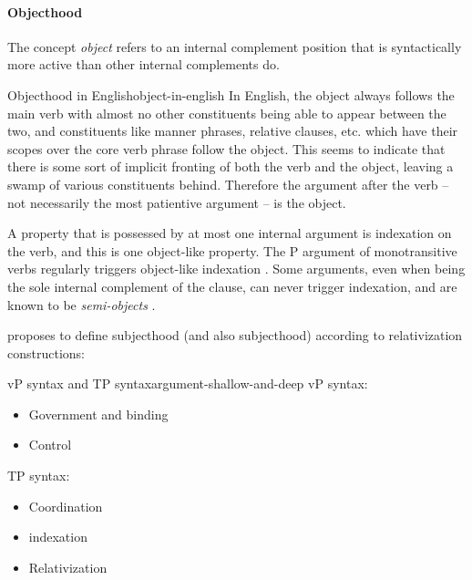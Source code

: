 \documentclass[a4paper, oneside, 12pt]{report}
\newcommand*{\citesec}[1]{\S~{#1}}
\newcommand*{\citepage}[1]{p.~{#1}}
\newcommand*{\term}[1]{\emph{#1}}
\begin{document}
\paragraph*{Objecthood}\label{sec:grammatical.clause.internal.object}
The concept \term{object} refers to an internal complement position
that is syntactically more active than other internal complements do.

\begin{infobox}{Objecthood in English}{object-in-english}
    In English, the object always follows the main verb with almost no other constituents
    being able to appear between the two,
    and constituents like manner phrases, relative clauses, etc.
    which have their scopes over the core verb phrase follow the object.
    This seems to indicate that there is some sort of implicit fronting 
    of both the verb and the object,
    leaving a swamp of various constituents behind.
    Therefore the argument after the verb -- not necessarily the most patientive argument --
    is the object.
\end{infobox}

A property that is possessed by at most one internal argument is indexation on the verb,
and this is one object-like property. 
The P argument of monotransitive verbs regularly triggers object-like indexation
\citep[\citesec{8.1.3}, \citepage{543}]{jacques2021grammar}.
Some arguments, even when being the sole internal complement of the clause,
can never trigger indexation, and are known to be \term{semi-objects}
\citep[\citesec{8.1.5}]{jacques2021grammar}.

\citet{jacques2016subjects} proposes to define subjecthood (and also subjecthood)
according to relativization constructions:


\begin{todobox}{vP syntax and TP syntax}{argument-shallow-and-deep}
    vP syntax:
    \begin{itemize}
        \item Government and binding
        \item Control
    \end{itemize}
    TP syntax:
    \begin{itemize}
        \item Coordination
        \item indexation
        \item Relativization \citep{jacques2016subjects}
    \end{itemize}
\end{todobox}
\end{document}
